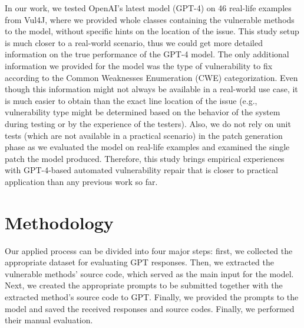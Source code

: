 In our work, we tested OpenAI's latest model (GPT-4) on 46 real-life examples from Vul4J, where we provided whole classes containing the vulnerable methods to the model, without specific hints on the location of the issue.
This study setup is much closer to a real-world scenario, thus we could get more detailed information on the true performance of the GPT-4 model.
The only additional information we provided for the model was the type of vulnerability to fix according to the Common Weaknesses Enumeration (CWE) categorization.
Even though this information might not always be available in a real-world use case, it is much easier to obtain than the exact line location of the issue (e.g., vulnerability type might be determined based on the behavior of the system during testing or by the experience of the testers).
Also, we do not rely on unit tests (which are not available in a practical scenario) in the patch generation phase as we evaluated the model on real-life examples and examined the single patch the model produced.
Therefore, this study brings empirical experiences with GPT-4-based automated vulnerability repair that is closer to practical application than any previous work so far.


\section{Methodology}
\label{sec:methodology}


Our applied process can be divided into four major steps: first, we collected the appropriate dataset for evaluating GPT responses.
Then, we extracted the vulnerable methods' source code, which served as the main input for the model.
Next, we created the appropriate prompts to be submitted together with the extracted method's source code to GPT.
Finally, we provided the prompts to the model
and saved the received responses and source codes.
Finally, we performed their manual evaluation.


